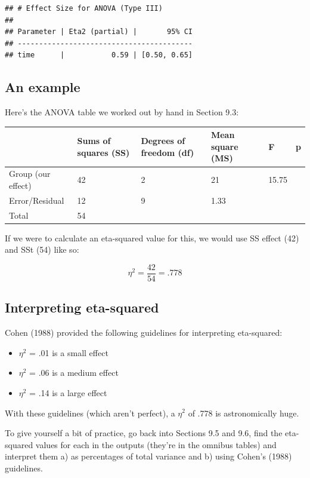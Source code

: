 \documentclass[
]{book}
\providecommand{\tightlist}{%
  \setlength{\itemsep}{0pt}\setlength{\parskip}{0pt}}
\begin{document}
\begin{verbatim}
## # Effect Size for ANOVA (Type III)
## 
## Parameter | Eta2 (partial) |       95% CI
## -----------------------------------------
## time      |           0.59 | [0.50, 0.65]
\end{verbatim}

\subsection{An example}\label{an-example}

Here's the ANOVA table we worked out by hand in Section 9.3:

\begin{tabular}{l|l|l|l|l|l}
\hline
 & Sums of squares (SS) & Degrees of freedom (df) & Mean square (MS) & F & p\\
\hline
Group (our effect) & 42 & 2 & 21 & 15.75 & \\
\hline
Error/Residual & 12 & 9 & 1.33 &  & \\
\hline
Total & 54 &  &  &  & \\
\hline
\end{tabular}

If we were to calculate an eta-squared value for this, we would use SS effect (42) and SSt (54) like so:

\[
\eta^2 = \frac{42}{54} = .778
\]

\subsection{Interpreting eta-squared}\label{interpreting-eta-squared}

Cohen (1988) provided the following guidelines for interpreting eta-squared:

\begin{itemize}
\tightlist
\item
  \(\eta^2\) = .01 is a small effect
\item
  \(\eta^2\) = .06 is a medium effect
\item
  \(\eta^2\) = .14 is a large effect
\end{itemize}

With these guidelines (which aren't perfect), a \(\eta^2\) of .778 is astronomically huge.

To give yourself a bit of practice, go back into Sections 9.5 and 9.6, find the eta-squared values for each in the outputs (they're in the omnibus tables) and interpret them a) as percentages of total variance and b) using Cohen's (1988) guidelines.
\end{document}
